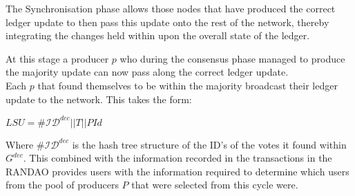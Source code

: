 The Synchronisation phase allows those nodes that have produced the correct ledger update to then pass this update onto the rest of the network, thereby integrating the changes held within upon the overall state of the ledger.

At this stage a producer $p$ who during the consensus phase managed to produce the majority update can now pass along the correct ledger update. \\

Each $p$ that found themselves to be within the majority broadcast their ledger update to the network. This takes the form: 

\begin{center} 
$LSU = \#\mathcal{ID}^{dec} || T || PId$
\end{center} 

Where $\#\mathcal{ID}^{dec}$ is the hash tree structure of the ID's of the votes it found within $G^{dec}$. This combined with the information recorded in the transactions in the RANDAO provides users with the information required to determine which users from the pool of producers $P$ that were selected from this cycle were.

